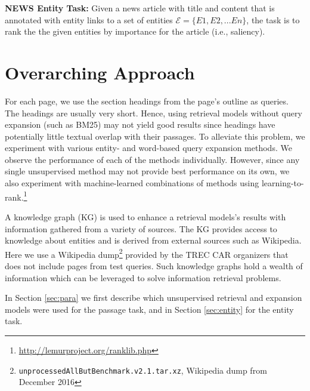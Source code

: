 \documentclass{article}
\begin{document}
\noindent \textbf{NEWS Entity Task:} Given a news article with title and content that is annotated with entity links to a set of entities  $\mathcal{E}=\{E1, E2, ... En\}$, the task is to rank the the given entities by importance for the article (i.e., saliency). 

\medskip 

\section{Overarching Approach}
\label{sec:overarching}
 For each page, we use the section headings from the page's outline as queries. The headings are usually very short. Hence, using retrieval models without query expansion (such as BM25) may not yield good results since headings have potentially little textual overlap with their passages. To alleviate this problem, we experiment with various entity- and word-based query expansion methods. We observe the performance of each of the methods individually. However, since any single unsupervised method may not provide best performance on its own, we also experiment with machine-learned combinations of methods using learning-to-rank.\footnote{\url{http://lemurproject.org/ranklib.php}} 

A knowledge graph (KG) is used to enhance a retrieval models's results with information gathered from a variety of sources. The KG provides access to knowledge about entities and is derived from external sources such as Wikipedia. Here we use a Wikipedia dump\footnote{\texttt{unprocessedAllButBenchmark.v2.1.tar.xz}, Wikipedia dump from December 2016} provided by the TREC CAR organizers that does not include pages from test queries. Such knowledge graphs hold a wealth of information which can be leveraged to solve information retrieval problems. 

In Section \ref{sec:para} we first describe which unsupervised retrieval and expansion models were used for the passage task, and in Section \ref{sec:entity} for the entity task.  

\end{document}
